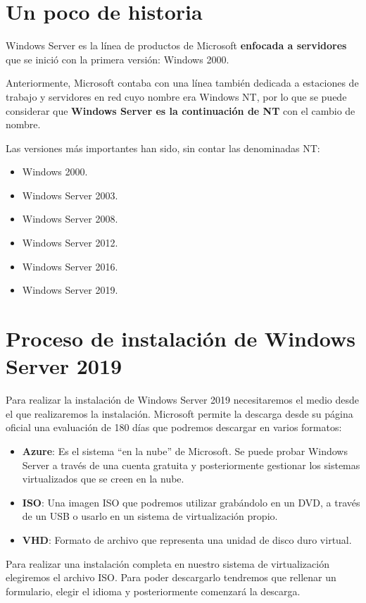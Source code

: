 \chapter{Un poco de historia}

Windows Server es la línea de productos de Microsoft \textbf{enfocada a servidores} que se inició con la primera versión: Windows 2000.

Anteriormente, Microsoft contaba con una línea también dedicada a estaciones de trabajo y servidores en red cuyo nombre era Windows NT, por lo que se puede considerar que \textbf{Windows Server es la continuación de NT} con el cambio de nombre.

Las versiones más importantes han sido, sin contar las denominadas NT:
\begin{itemize}
    \item Windows 2000.
    \item Windows Server 2003.
    \item Windows Server 2008.
    \item Windows Server 2012.
    \item Windows Server 2016.
    \item Windows Server 2019.
\end{itemize}

\chapter{Proceso de instalación de Windows Server 2019}
Para realizar la instalación de Windows Server 2019 necesitaremos el medio desde el que realizaremos la instalación. Microsoft permite la descarga desde su página oficial una evaluación de 180 días que podremos descargar en varios formatos:

\begin{itemize}
    \item \textbf{Azure}: Es el sistema “en la nube” de Microsoft. Se puede probar Windows Server a través de una cuenta gratuita y posteriormente gestionar los sistemas virtualizados que se creen en la nube.
    \item \textbf{ISO}: Una imagen ISO que podremos utilizar grabándolo en un DVD, a través de un USB o usarlo en un sistema de virtualización propio.
    \item \textbf{VHD}: Formato de archivo que representa una unidad de disco duro virtual.
\end{itemize}

Para realizar una instalación completa en nuestro sistema de virtualización elegiremos el archivo ISO. Para poder descargarlo tendremos que rellenar un formulario, elegir el idioma y posteriormente comenzará la descarga.


